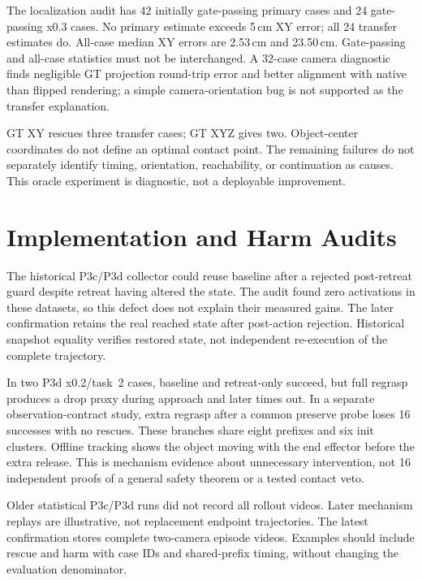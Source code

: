 \documentclass{article}
\begin{document}
The localization audit has 42 initially gate-passing primary cases and 24
gate-passing x0.3 cases. No primary estimate exceeds 5\,cm XY error; all 24
transfer estimates do. All-case median XY errors are 2.53\,cm and 23.50\,cm.
Gate-passing and all-case statistics must not be interchanged.
A 32-case camera diagnostic finds negligible GT projection round-trip error
and better alignment with native than flipped rendering; a simple
camera-orientation bug is not supported as the transfer explanation.

\begin{table}[ht]
\caption{Privileged grounding diagnostic, 16 cases per cohort.
Simulator coordinates replace predictions only in explicit oracle arms.}
\centering\small
\end{table}
GT XY rescues three transfer cases; GT XYZ gives two.
Object-center coordinates do not define an optimal contact point.
The remaining failures do not separately identify timing, orientation,
reachability, or continuation as causes.
This oracle experiment is diagnostic, not a deployable improvement.

\section{Implementation and Harm Audits}
\label{app:audit}
The historical P3c/P3d collector could reuse baseline after a rejected
post-retreat guard despite retreat having altered the state.
The audit found zero activations in these datasets, so this defect does
not explain their measured gains.
The later confirmation retains the real reached state after post-action
rejection. Historical snapshot equality verifies restored state, not
independent re-execution of the complete trajectory.

In two P3d x0.2/task~2 cases, baseline and retreat-only succeed, but full
regrasp produces a drop proxy during approach and later times out.
In a separate observation-contract study, extra regrasp after a common
preserve probe loses 16 successes with no rescues. These branches share eight
prefixes and six init clusters.
Offline tracking shows the object moving with the end effector before
the extra release. This is mechanism evidence about unnecessary intervention,
not 16 independent proofs of a general safety theorem or a tested contact veto.

Older statistical P3c/P3d runs did not record all rollout videos.
Later mechanism replays are illustrative, not replacement endpoint trajectories.
The latest confirmation stores complete two-camera episode videos.
Examples should include rescue and harm with case IDs and shared-prefix
timing, without changing the evaluation denominator.
\end{document}
